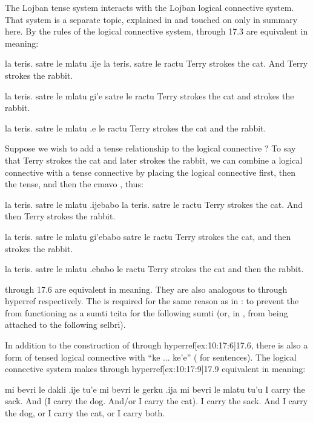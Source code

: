 The Lojban tense system interacts with the Lojban logical
    connective system. That system is a separate topic, explained
    in  and touched on only in
    summary here. By the rules of the logical connective system,  through 17.3 are equivalent in
    meaning:
\begin{example}
la teris. satre le mlatu\n
\T	.ije la teris. satre le ractu\n
Terry strokes the cat.\n
\T	And Terry strokes the rabbit.
\end{example}

\begin{example}
la teris. satre le mlatu gi'e satre le ractu\n
Terry strokes the cat and strokes the rabbit.
\end{example}

\begin{example}
la teris. satre le mlatu .e le ractu\n
Terry strokes the cat and the rabbit.
\end{example}

Suppose we wish to add a tense relationship to the logical
    connective ? To say that Terry strokes the cat and later
    strokes the rabbit, we can combine a logical connective with a
    tense connective by placing the logical connective first, then
    the tense, and then the cmavo , thus:
\begin{example}
la teris. satre le mlatu\n
\T	.ijebabo la teris. satre le ractu\n
Terry strokes the cat.\n
\T	And then Terry strokes the rabbit.
\end{example}

\begin{example}
la teris. satre le mlatu gi'ebabo satre le ractu\n
Terry strokes the cat, and then strokes the rabbit.
\end{example}

\begin{example}
la teris. satre le mlatu .ebabo le ractu\n
Terry strokes the cat and then the rabbit.
\end{example}

 through 17.6 are equivalent
    in meaning. They are also analogous to  through hyperref respectively. The  is required for
    the same reason as in : to
    prevent the  from functioning as a sumti tcita for the
    following sumti (or, in , from
    being attached to the following selbri). 

In addition to the  construction of  through hyperref[ex:10:17:6]{17.6},
    there is also a form of tensed logical connective with ``ke ...
    ke'e'' ( for sentences). The logical connective
    system makes  through hyperref[ex:10:17:9]{17.9} equivalent in meaning:
\begin{example}
mi bevri le dakli\n
\T	.ije tu'e mi bevri le gerku\n
\T	.ija mi bevri le mlatu tu'u\n
I carry the sack.\n
\T	And (I carry the dog.\n
\T	And/or I carry the cat).\n
I carry the sack. And I carry the dog, or I carry\n
\T	the cat, or I carry both.
\end{example}

